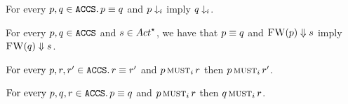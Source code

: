 \begin{lemma}%
  \label{lem:terminate-sc}
  For every $p, q \in \texttt{ACCS} . \, p \equiv q$ and $p \downarrow_i$ imply $q \downarrow_i$.
\end{lemma}

\begin{lemma}%
  \label{lem:acnv-sc}
  For every $p, q \in \texttt{ACCS}$ and $\trace \in \Actfin$, we have that $p \equiv q$ and $\textsc{FW}(p) \mathrel{\Downarrow} s$
  imply $\textsc{FW}(q) \mathrel{\Downarrow} s$.
\end{lemma}


\begin{lemma}%
  \label{lem:must-sc-client}
  $\text{For every }  p, r, r' \in \texttt{ACCS} . \, r \equiv r'$ and $p \operatorname{\textsc{must}}_i r$ then $p \operatorname{\textsc{must}}_i r'$.
\end{lemma}

\begin{lemma}%
  \label{lem:must-sc-server}
  $\text{For every } p, q, r  \in \texttt{ACCS} . \, p \equiv q$ and $p \operatorname{\textsc{must}}_i r$ then $q \operatorname{\textsc{must}}_i r$.
\end{lemma}


\newcommand{\serverC}{q'}




